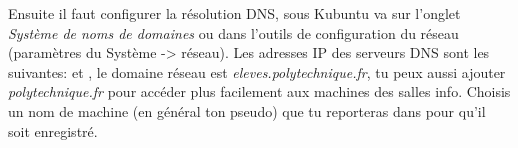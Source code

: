Ensuite il faut configurer la résolution DNS, sous Kubuntu va sur l'onglet \textit{Système de noms de domaines} ou dans l'outils de configuration du réseau
(paramètres du Système -> réseau). Les adresses IP des serveurs DNS sont les suivantes:  et , le domaine réseau
est \textit{eleves.polytechnique.fr}, tu peux aussi ajouter \textit{polytechnique.fr} pour accéder plus facilement aux machines des salles info. Choisis un nom de machine
(en général ton pseudo) que tu reporteras dans  pour qu'il soit enregistré.
% 
% 
% 
% 
